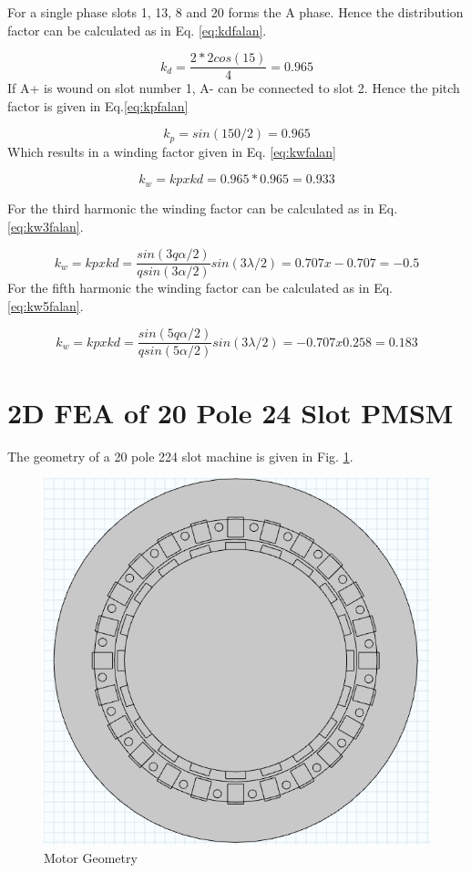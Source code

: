 \documentclass{article}
\begin{document}
For a single phase slots 1, 13, 8 and 20 forms the A phase. Hence the distribution factor can be calculated as in Eq. \ref{eq:kdfalan}.

\begin{equation}
	k_d=\frac{2*2cos(15)}{4}=0.965
	\label{eq:kdfalan}
\end{equation}
 If A+ is wound on slot number 1, A- can be connected to slot 2. Hence the pitch factor is given in Eq.\ref{eq:kpfalan}
 
 \begin{equation}
 k_p=sin(150/2)=0.965
 \label{eq:kpfalan}
 \end{equation}
  Which results in a winding factor given in Eq. \ref{eq:kwfalan}
  
   \begin{equation}
  k_w=kpxkd=0.965*0.965=0.933
  \label{eq:kwfalan}
  \end{equation}
  
 For the third harmonic the winding factor can be calculated as in Eq.\ref{eq:kw3falan}. 
 
    \begin{equation}
  k_w=kpxkd=\frac{sin(3q\alpha/2)}{qsin(3\alpha/2)}sin(3\lambda/2)=0.707x -0.707=-0.5
  \label{eq:kw3falan}
  \end{equation}
  For the fifth harmonic the winding factor can be calculated as in Eq. \ref{eq:kw5falan}.
  
  \begin{equation}
  k_w=kpxkd=\frac{sin(5q\alpha/2)}{qsin(5\alpha/2)}sin(3\lambda/2)=-0.707x 0.258=0.183 
  \label{eq:kw5falan}
  \end{equation}
  
  
  
  
 \section{2D FEA of 20 Pole 24 Slot PMSM}
 
 The geometry of a 20 pole 224 slot machine is given in Fig. \ref{fig:feageom}.
 

\begin{figure}[H]
	\centering
	\includegraphics[width=0.7\linewidth]{Figurler/FEAgeom}
	\caption{Motor Geometry}
	\label{fig:feageom}
\end{figure}
\end{document}

